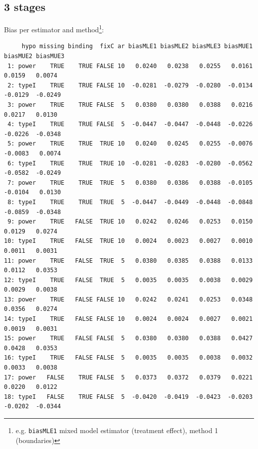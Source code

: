 \documentclass[12pt]{article}
\begin{document}
\subsection{3 stages}
\label{sec:orgeec01bf}
Bias per estimator and method\footnote{e.g. \texttt{biasMLE1} mixed model
estimator (treatment effect), method 1 (boundaries)}:
\begin{adjustwidth}{-1cm}{-1cm}
\begin{verbatim}
     hypo missing binding  fixC ar biasMLE1 biasMLE2 biasMLE3 biasMUE1 biasMUE2 biasMUE3
 1: power    TRUE    TRUE FALSE 10   0.0240   0.0238   0.0255   0.0161   0.0159   0.0074
 2: typeI    TRUE    TRUE FALSE 10  -0.0281  -0.0279  -0.0280  -0.0134  -0.0129  -0.0249
 3: power    TRUE    TRUE FALSE  5   0.0380   0.0380   0.0388   0.0216   0.0217   0.0130
 4: typeI    TRUE    TRUE FALSE  5  -0.0447  -0.0447  -0.0448  -0.0226  -0.0226  -0.0348
 5: power    TRUE    TRUE  TRUE 10   0.0240   0.0245   0.0255  -0.0076  -0.0083   0.0074
 6: typeI    TRUE    TRUE  TRUE 10  -0.0281  -0.0283  -0.0280  -0.0562  -0.0582  -0.0249
 7: power    TRUE    TRUE  TRUE  5   0.0380   0.0386   0.0388  -0.0105  -0.0104   0.0130
 8: typeI    TRUE    TRUE  TRUE  5  -0.0447  -0.0449  -0.0448  -0.0848  -0.0859  -0.0348
 9: power    TRUE   FALSE  TRUE 10   0.0242   0.0246   0.0253   0.0150   0.0129   0.0274
10: typeI    TRUE   FALSE  TRUE 10   0.0024   0.0023   0.0027   0.0010   0.0011   0.0031
11: power    TRUE   FALSE  TRUE  5   0.0380   0.0385   0.0388   0.0133   0.0112   0.0353
12: typeI    TRUE   FALSE  TRUE  5   0.0035   0.0035   0.0038   0.0029   0.0029   0.0038
13: power    TRUE   FALSE FALSE 10   0.0242   0.0241   0.0253   0.0348   0.0356   0.0274
14: typeI    TRUE   FALSE FALSE 10   0.0024   0.0024   0.0027   0.0021   0.0019   0.0031
15: power    TRUE   FALSE FALSE  5   0.0380   0.0380   0.0388   0.0427   0.0428   0.0353
16: typeI    TRUE   FALSE FALSE  5   0.0035   0.0035   0.0038   0.0032   0.0033   0.0038
17: power   FALSE    TRUE FALSE  5   0.0373   0.0372   0.0379   0.0221   0.0220   0.0122
18: typeI   FALSE    TRUE FALSE  5  -0.0420  -0.0419  -0.0423  -0.0203  -0.0202  -0.0344
\end{verbatim}
\end{adjustwidth}
\end{document}
